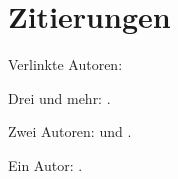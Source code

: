 \documentclass[ngerman]{scrbook}
\begin{document}
\chapter{Zitierungen}
Verlinkte Autoren:

Drei und mehr: \citeauthor{ABC01} \cite{ABC01}.

Zwei Autoren: \citeauthor{AB00} \cite{AB00} und \citeauthor{vdAW2013} \cite{vdAW2013}.

Ein Autor: \citeauthor{Ez10} \cite{Ez10}.

\nocite{*}
\printbibliography
\end{document}
